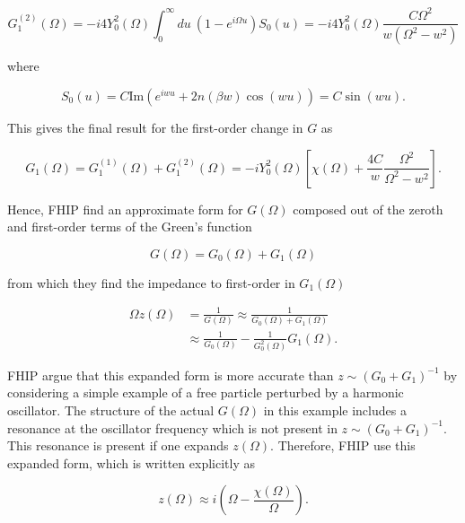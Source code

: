 \begin{equation}
    G^{(2)}_1(\Omega) = -i4Y_0^2(\Omega) \int^\infty_0 du\ \left(1 - e^{i\Omega u} \right) S_0(u) = -i4Y_0^2(\Omega) \frac{C \Omega^2}{w(\Omega^2 - w^2)}
\end{equation}

where

\begin{equation}
    S_0(u) = C \text{Im} \left( e^{iwu} + 2 n(\beta w) \cos(wu) \right) = C \sin(wu).
\end{equation}

This gives the final result for the first-order change in $G$ as

\begin{equation}
    G_1(\Omega) = G^{(1)}_1(\Omega) + G^{(2)}_1(\Omega) = -iY_0^2(\Omega) \left[ \chi(\Omega) + \frac{4C}{w} \frac{\Omega^2}{\Omega^2 - w^2} \right].
\end{equation}

Hence, FHIP find an approximate form for $G(\Omega)$ composed out of the zeroth and first-order terms of the Green's function

\begin{equation}
    G(\Omega) = G_0(\Omega) + G_1(\Omega)
\end{equation}

from which they find the impedance to first-order in $G_1(\Omega)$

\begin{equation}
    \begin{aligned}
    \Omega z(\Omega) &= \frac{1}{G(\Omega)} \approx \frac{1}{G_0(\Omega) + G_1(\Omega)} \\
    &\approx \frac{1}{G_0(\Omega)} - \frac{1}{G_0^2(\Omega)} G_1(\Omega).
    \end{aligned}
\end{equation}

FHIP argue that this expanded form is more accurate than $z \sim (G_0 + G_1)^{-1}$ by considering a simple example of a free particle perturbed by a harmonic oscillator. The structure of the actual $G(\Omega)$ in this example includes a resonance at the oscillator frequency which is not present in $z \sim (G_0 + G_1)^{-1}$. This resonance is present if one expands $z(\Omega)$. Therefore, FHIP use this expanded form, which is written explicitly as

\begin{equation}\label{eqn:fhip_impedance}
    z(\Omega) \approx i\left(\Omega - \frac{\chi(\Omega)}{\Omega}\right).
\end{equation}

